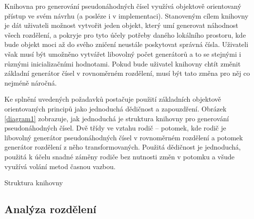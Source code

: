 \documentclass[a4paper,11pt]{article}
\begin{document}
Knihovna pro generování pseudonáhodných čísel využívá objektově orientovaný přístup ve svém návrhu (a posléze i v implementaci). Stanoveným cílem knihovny je dát uživateli možnost vytvořit jeden objekt, který umí generovat náhodnost všech rozdělení, a pokryje pro tyto účely potřeby daného lokálního prostoru, kde bude objekt moci až do svého zničení neustále poskytovat správná čísla. Uživateli však musí být umožněno vytvářet libovolný počet generátorů a to se stejnými i různými inicializačními hodnotami. Pokud bude uživatel knihovny chtít změnit základní generátor čísel v rovnoměrném rozdělení, musí být tato změna pro něj co nejméně náročná.

Ke splnění uvedených požadavků postačuje použití základních objektově orientovaných principů jako jednoduchá dědičnost a zapouzdření. Obrázek \ref{diagram1} zobrazuje, jak jednoduchá je struktura knihovny pro generování pseudonáhodných čísel. Dvě třídy ve vztahu rodič – potomek, kde rodič je libovolný generátor pseudonáhodných čísel v rovnoměrném rozdělení a potomek generátor rozdělení z něho transformovaných. Použitá dědičnost je jednoduchá, použitá k účelu snadné záměny rodiče bez nutnosti změn v potomku a všude využívá volání metod časnou vazbou.

\begin{table}[h]
\begin{center}
\caption{\label{diagram1}Struktura knihovny}
\end{center}
\end{table}
\subsection{Analýza rozdělení}
\end{document}
